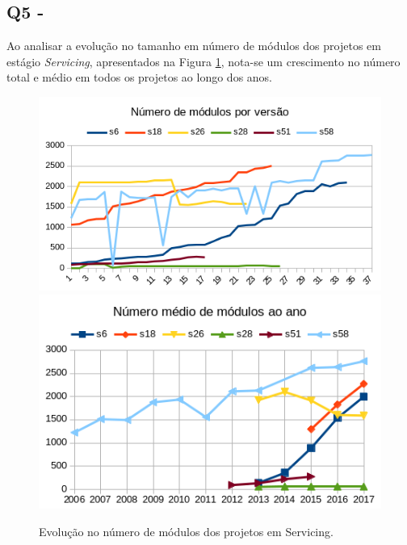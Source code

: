 \subsection{Q5 - \QuestaoCinco} %


Ao analisar a evolução no tamanho em número de módulos dos projetos em estágio
{\it Servicing}, apresentados na Figura \ref{modules-evolution-servicing},
nota-se um crescimento no número total e médio em todos os projetos ao longo
dos anos.


\begin{figure}[h]
  \center
  \includegraphics[scale=0.6]{imagens/modules-evolution-servicing.png}
  \includegraphics[scale=0.6]{imagens/modules-evolution-average.png}
  \caption{Evolução no número de módulos dos projetos em Servicing.}
  \label{modules-evolution-servicing}
\end{figure}

